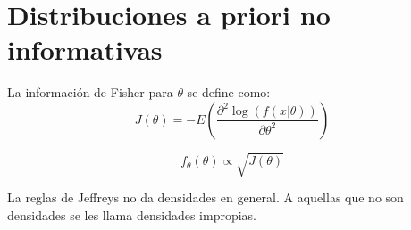 \section{Distribuciones a priori no informativas}
\begin{definition}
    La información de Fisher para $\theta$ se define como:
    $$J(\theta) = -E\left(\frac{\partial^2 \log(f(x|\theta))}{\partial\theta^2}\right)$$
\end{definition}

\begin{proposition}
    $$f_\theta(\theta) \propto \sqrt{J(\theta)}$$
\end{proposition}

\begin{remark}
    La reglas de Jeffreys no da densidades en general.
    A aquellas que no son densidades se les llama densidades impropias.
\end{remark}